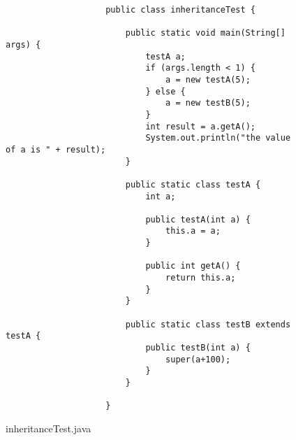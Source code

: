 \documentclass{dithesis}
\begin{document}
            \begin{figure}[H]
                \begin{lstlisting}
                    public class inheritanceTest {

                        public static void main(String[] args) {
                            testA a;
                            if (args.length < 1) {
                                a = new testA(5);
                            } else {
                                a = new testB(5);
                            }
                            int result = a.getA();
                            System.out.println("the value of a is " + result);
                        }

                        public static class testA {
                            int a;

                            public testA(int a) {
                                this.a = a;
                            }

                            public int getA() {
                                return this.a;
                            }
                        }

                        public static class testB extends testA {
                            public testB(int a) {
                                super(a+100);
                            }
                        }

                    }
                \end{lstlisting}
            \caption{inheritanceTest.java}
            \end{figure}
\end{document}
